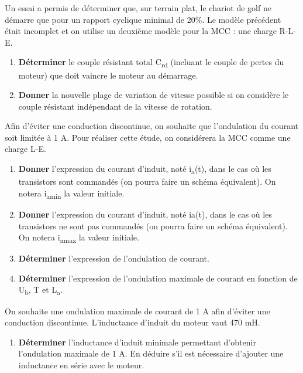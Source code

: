 Un essai a permis de déterminer que, sur terrain plat, le chariot de golf ne démarre que pour un rapport cyclique minimal de 20\%. Le modèle précédent était incomplet et on utilise un deuxième modèle pour la MCC : une charge R-L-E.

\begin{enumerate}
\def\labelenumi{\arabic{enumi}.}
\setcounter{enumi}{7}
\item
  \textbf{Déterminer} le couple résistant total C\textsubscript{rd} (incluant le couple de pertes du moteur) que doit vaincre le moteur au démarrage.
\item
  \textbf{Donner} la nouvelle plage de variation de vitesse possible si on considère le couple résistant indépendant de la vitesse de rotation.
\end{enumerate}

Afin d'éviter une conduction discontinue, on souhaite que l'ondulation du courant soit limitée à 1 A. Pour réaliser cette étude, on considérera la MCC comme une charge L-E.

\begin{enumerate}
\def\labelenumi{\arabic{enumi}.}
\setcounter{enumi}{9}
\item
  \textbf{Donner} l'expression du courant d'induit, noté i\textsubscript{a}(t), dans le cas où les transistors sont commandés (on pourra faire un schéma équivalent). On notera i\textsubscript{amin} la valeur initiale.
\item
  \textbf{Donner} l'expression du courant d'induit, noté ia(t), dans le cas où les transistors ne sont pas commandés (on pourra faire un schéma équivalent). On notera i\textsubscript{amax} la valeur initiale.
\item
  \textbf{Déterminer} l'expression de l'ondulation de courant.
\item
  \textbf{Déterminer} l'expression de l'ondulation maximale de courant en fonction de U\textsubscript{b}, T et L\textsubscript{a}.
\end{enumerate}

On souhaite une ondulation maximale de courant de 1 A afin d'éviter une conduction discontinue. L'inductance d'induit du moteur vaut 470 mH.

\begin{enumerate}
\def\labelenumi{\arabic{enumi}.}
\setcounter{enumi}{13}
\tightlist
\item
  \textbf{Déterminer} l'inductance d'induit minimale permettant d'obtenir l'ondulation maximale de 1 A. En déduire s'il est nécessaire d'ajouter une inductance en série avec le moteur.
\end{enumerate}


